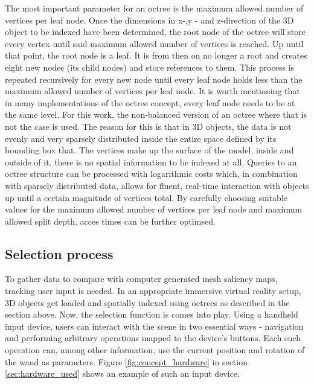 The most important parameter for an octree is the maximum allowed number of vertices per leaf node. Once the dimensions in x-,y - and z-direction of the 3D object to be indexed have been determined, the root node of the octree will store every vertex until said maximum allowed number of vertices is reached. Up until that point, the root node is a leaf. It is from then on no longer a root and creates eight new nodes (its child nodes) and store references to them. This process is repeated recursively for every new node until every leaf node holds less than the maximum allowed number of vertices per leaf node. It is worth mentioning that in many implementations of the octree concept, every leaf node needs to be at the same level. For this work, the non-balanced version of an octree where that is not the case is used. The reason for this is that in 3D objects, the data is not evenly and very sparsely distributed inside the entire space defined by its bounding box that. The vertices make up the surface of the model, inside and outside of it, there is no spatial information to be indexed at all. Queries to an octree structure can be processed with logarithmic costs which, in combination with sparsely distributed data, allows for fluent, real-time interaction with objects up until a certain magnitude of vertices total. By carefully choosing suitable values for the maximum allowed number of vertices per leaf node and maximum allowed split depth, acces times can be further optimsed.

		\subsection{Selection process}
		\label{sec:selection_process}

To gather data to compare with computer generated mesh saliency maps, tracking user input is needed. In an appropriate immersive virtual reality setup, 3D objects get loaded and spatially indexed using octrees as described in the section above. Now, the selection function is comes into play. Using a handheld input device, users can interact with the scene in two essential ways - navigation and performing arbitrary operations mapped to the device's buttons. Each such operation can, among other information, use the current position and rotation of the wand as parameters. Figure \ref{fig:concept_hardware} in section \ref{sec:hardware_used} shows an example of such an input device.



